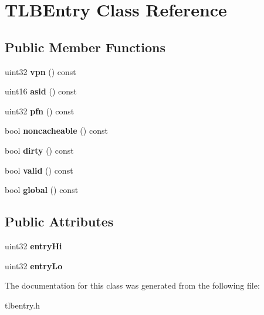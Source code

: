 \hypertarget{classTLBEntry}{
\section{TLBEntry Class Reference}
\label{classTLBEntry}
}
\subsection*{Public Member Functions}
\begin{DoxyCompactItemize}
\item 
\hypertarget{classTLBEntry_a4febc7aae3fda3da47da131e28cbdf50}{
uint32 {\bfseries vpn} () const }
\label{classTLBEntry_a4febc7aae3fda3da47da131e28cbdf50}

\item 
\hypertarget{classTLBEntry_a9ea42aca3ac9841e50ca88717a57675d}{
uint16 {\bfseries asid} () const }
\label{classTLBEntry_a9ea42aca3ac9841e50ca88717a57675d}

\item 
\hypertarget{classTLBEntry_a4595566739ea73c5b89a1bb9a8b472fc}{
uint32 {\bfseries pfn} () const }
\label{classTLBEntry_a4595566739ea73c5b89a1bb9a8b472fc}

\item 
\hypertarget{classTLBEntry_ac2a92150e0568daa9810e624d39a235b}{
bool {\bfseries noncacheable} () const }
\label{classTLBEntry_ac2a92150e0568daa9810e624d39a235b}

\item 
\hypertarget{classTLBEntry_a035428d115899db13cad9ae4a0bd19d6}{
bool {\bfseries dirty} () const }
\label{classTLBEntry_a035428d115899db13cad9ae4a0bd19d6}

\item 
\hypertarget{classTLBEntry_a29878217888278dbe3bc4ab3abbf081e}{
bool {\bfseries valid} () const }
\label{classTLBEntry_a29878217888278dbe3bc4ab3abbf081e}

\item 
\hypertarget{classTLBEntry_a958ad780663c9f6ff19f5011223abc4a}{
bool {\bfseries global} () const }
\label{classTLBEntry_a958ad780663c9f6ff19f5011223abc4a}

\end{DoxyCompactItemize}
\subsection*{Public Attributes}
\begin{DoxyCompactItemize}
\item 
\hypertarget{classTLBEntry_a7c5e2152c1e6555442f578bf5f0d35ee}{
uint32 {\bfseries entryHi}}
\label{classTLBEntry_a7c5e2152c1e6555442f578bf5f0d35ee}

\item 
\hypertarget{classTLBEntry_a19348876d3ee848767dc483d89be40bc}{
uint32 {\bfseries entryLo}}
\label{classTLBEntry_a19348876d3ee848767dc483d89be40bc}

\end{DoxyCompactItemize}


The documentation for this class was generated from the following file:\begin{DoxyCompactItemize}
\item 
tlbentry.h\end{DoxyCompactItemize}
